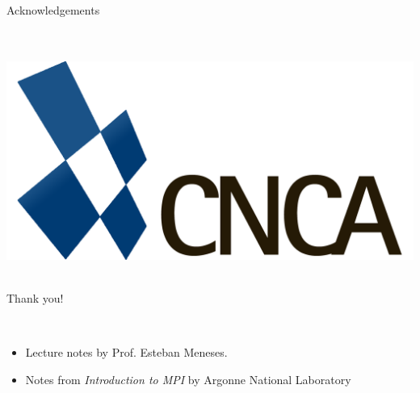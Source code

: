 \begin{frame}{Acknowledgements}
    \begin{center}
        ~\\~\\
        \includegraphics[scale=0.1]{img/logoR.png}\\~\\
        \begin{large}
           Thank you!
        \end{large}
    \end{center}
    ~\\
   
    \begin{itemize}
        \item Lecture notes by Prof. Esteban Meneses.
        \item Notes from \textit{Introduction to MPI} by Argonne National Laboratory
    \end{itemize}
   
\end{frame}